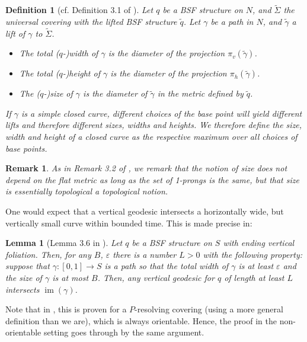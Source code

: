 \documentclass[10pt,a4paper]{amsart}
\let\epsilon\varepsilon
\newtheorem{remark}[theorem]{Remark}
\newtheorem{definition}[theorem]{Definition}
\newtheorem{lemma}[theorem]{Lemma}
\begin{document}
\begin{definition}[cf. Definition 3.1 of \cite{BHW2}]\label{def:size}
    Let $q$ be a BSF structure on $N$, and $\tilde{\Sigma}$ the universal covering with the lifted BSF structure $\tilde{q}$.
    Let $\gamma$ be a path in $N$, and $\tilde{\gamma}$ a lift of $\gamma$ to $\tilde{\Sigma}$.
    \begin{itemize}
        \item The \emph{total ($q$-)width} of $\gamma$ is the diameter of the projection $\pi_v(\tilde{\gamma})$.
        \item The \emph{total ($q$-)height} of $\gamma$ is the diameter of the projection $\pi_h(\tilde{\gamma})$.
        \item The \emph{($q$-)size} of $\gamma$ is the diameter of $\tilde{\gamma}$ in the metric defined by $\tilde{q}$.
    \end{itemize}

    If $\gamma$ is a simple closed curve, different choices of the base point will yield different lifts and therefore different sizes, widths and heights.
    We therefore define the size, width and height of a closed curve as the respective maximum over all choices of base points.
\end{definition}

\begin{remark}
    As in Remark 3.2 of \cite{BHW2}, we remark that the notion of size does not depend on the flat metric as long as the set of 1-prongs is the same, but that size is essentially topological a topological notion.
\end{remark}

One would expect that a vertical geodesic intersects a horizontally wide, but vertically small curve within bounded time.
This is made precise in:

\begin{lemma}[Lemma 3.6 in \cite{BHW2}]\label{lem:target}
    Let $q$ be a BSF structure on $S$ with ending vertical foliation.
    Then, for any $B$, $\epsilon$ there is a number $L>0$ with the following property:
    suppose that $\gamma \colon [0,1]\rightarrow S$ is a path so that the total width of $\gamma$ is at least $\epsilon$ and the size of $\gamma$ is at most $B$.
    Then, any vertical geodesic for $q$ of length at least $L$ intersects $\operatorname{im}(\gamma)$.
\end{lemma}

Note that in \cite{BHW2}, this is proven for a $P$-resolving covering (using a more general definition than we are), which is always orientable.
Hence, the proof in the non-orientable setting goes through by the same argument.
\end{document}
